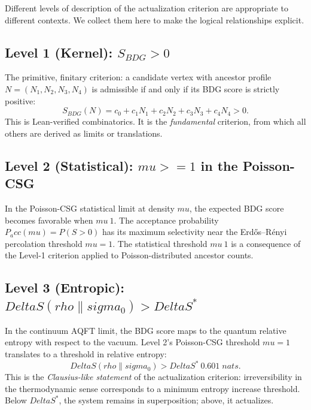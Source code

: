 \documentclass[11pt]{article}
\def\Delta{Delta}%
\def\rho{rho}%
\def\sigma{sigma}%
\def\mu{mu}%
\def\mathrm#1{#1}%
\def\mathbf#1{#1}%
\def\mathbb#1{#1}%
\def\text#1{#1}%
\def\geq{>=}%
\def\approx{~}%
\def\Pacc{P_acc}%
\newcommand{\Pacc}{P_{\mathrm{acc}}}
\begin{document}
Different levels of description of the actualization criterion are appropriate to different contexts. We collect them here to make the logical relationships explicit.

\subsection{Level 1 (Kernel): $S_{\mathrm{BDG}} > 0$}

The primitive, finitary criterion: a candidate vertex with ancestor profile $\mathbf{N} = (N_1, N_2, N_3, N_4)$ is admissible if and only if its BDG score is strictly positive:
\begin{equation}
\label{eq:level1}
S_{\mathrm{BDG}}(\mathbf{N}) = c_0 + c_1 N_1 + c_2 N_2 + c_3 N_3 + c_4 N_4 > 0.
\end{equation}
This is Lean-verified combinatorics. It is the \emph{fundamental} criterion, from which all others are derived as limits or translations.

\subsection{Level 2 (Statistical): $\mu \geq 1$ in the Poisson-CSG}

In the Poisson-CSG statistical limit at density $\mu$, the expected BDG score becomes favorable when $\mu \approx 1$. The acceptance probability $\Pacc(\mu) = \mathbb{P}(S > 0)$ has its maximum selectivity near the Erd\H{o}s--R\'enyi percolation threshold $\mu = 1$. The statistical threshold $\mu \approx 1$ is a consequence of the Level-1 criterion applied to Poisson-distributed ancestor counts.

\subsection{Level 3 (Entropic): $\Delta S(\rho\|\sigma_0) > \Delta S^*$}

In the continuum AQFT limit, the BDG score maps to the quantum relative entropy with respect to the vacuum. Level 2's Poisson-CSG threshold $\mu = 1$ translates to a threshold in relative entropy:
\begin{equation}
\label{eq:level3}
\Delta S(\rho \| \sigma_0) > \Delta S^* \approx 0.601\;\text{nats}.
\end{equation}
This is the \emph{Clausius-like statement} of the actualization criterion: irreversibility in the thermodynamic sense corresponds to a minimum entropy increase threshold. Below $\Delta S^*$, the system remains in superposition; above, it actualizes.
\end{document}
